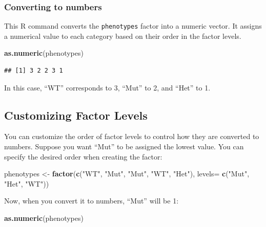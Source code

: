 \documentclass[
]{book}
\newenvironment{Shaded}{\begin{snugshade}}{\end{snugshade}}
\newcommand{\AttributeTok}[1]{\textcolor[rgb]{0.13,0.29,0.53}{#1}}
\newcommand{\FunctionTok}[1]{\textcolor[rgb]{0.13,0.29,0.53}{\textbf{#1}}}
\newcommand{\NormalTok}[1]{#1}
\newcommand{\OtherTok}[1]{\textcolor[rgb]{0.56,0.35,0.01}{#1}}
\newcommand{\StringTok}[1]{\textcolor[rgb]{0.31,0.60,0.02}{#1}}
\begin{document}
\hypertarget{converting-to-numbers}{%
\subsubsection{Converting to numbers}\label{converting-to-numbers}}

This R command converts the \texttt{phenotypes} factor into a numeric vector. It assigns a numerical value to each category based on their order in the factor levels.

\begin{Shaded}
\begin{Highlighting}[]
\FunctionTok{as.numeric}\NormalTok{(phenotypes)}
\end{Highlighting}
\end{Shaded}

\begin{verbatim}
## [1] 3 2 2 3 1
\end{verbatim}

In this case, ``WT'' corresponds to 3, ``Mut'' to 2, and ``Het'' to 1.

\hypertarget{customizing-factor-levels}{%
\subsection{Customizing Factor Levels}\label{customizing-factor-levels}}

You can customize the order of factor levels to control how they are converted to numbers. Suppose you want ``Mut'' to be assigned the lowest value. You can specify the desired order when creating the factor:

\begin{Shaded}
\begin{Highlighting}[]
\NormalTok{phenotypes }\OtherTok{\textless{}{-}} \FunctionTok{factor}\NormalTok{(}\FunctionTok{c}\NormalTok{(}\StringTok{"WT"}\NormalTok{, }\StringTok{"Mut"}\NormalTok{, }\StringTok{"Mut"}\NormalTok{, }\StringTok{"WT"}\NormalTok{, }\StringTok{"Het"}\NormalTok{), }
                     \AttributeTok{levels=} \FunctionTok{c}\NormalTok{(}\StringTok{"Mut"}\NormalTok{, }\StringTok{"Het"}\NormalTok{, }\StringTok{"WT"}\NormalTok{))}
\end{Highlighting}
\end{Shaded}

Now, when you convert it to numbers, ``Mut'' will be 1:

\begin{Shaded}
\begin{Highlighting}[]
\FunctionTok{as.numeric}\NormalTok{(phenotypes)}
\end{Highlighting}
\end{Shaded}
\end{document}
